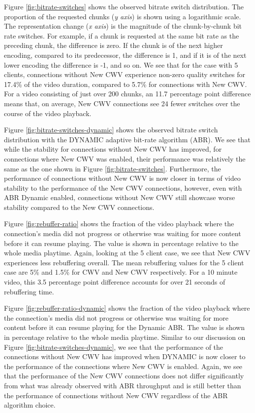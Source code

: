 \documentclass[10pt,sigconf]{acmart}
\begin{document}
Figure \ref{fig:bitrate-switches} shows the observed bitrate switch distribution. The proportion of the requested chunks (\emph{y axis}) is shown using a logarithmic scale. The representation change (\emph{x axis}) is the magnitude of the chunk-by-chunk bit rate switches. For example, if a chunk is requested at the same bit rate as the preceding chunk, the difference is zero. If the chunk is of the next higher encoding, compared to its predecessor, the difference is 1, and if it is of the next lower encoding the difference is -1, and so on. We see that for the case with 5 clients, connections without New CWV experience non-zero quality switches for 17.4\% of the video duration, compared to 5.7\% for connections with New CWV. For a video consisting of just over 200 chunks, an 11.7 percentage point difference means that, on average, New CWV connections see 24 fewer switches over the course of the video playback.

Figure \ref{fig:bitrate-switches-dynamic} shows the observed bitrate switch distribution with the DYNAMIC adaptive bit-rate algorithm (ABR). We see that while the stability for connections without New CWV has improved, for connections where New CWV was enabled, their performance was relatively the same as the one shown in Figure \ref{fig:bitrate-switches}. Furthermore, the performance of connections without New CWV is now closer in terms of video stability to the performance of the New CWV connections, however, even with ABR Dynamic enabled, connections without New CWV still showcase worse stability compared to the New CWV connections.

Figure \ref{fig:rebuffer-ratio} shows the fraction of the video playback where the connection's media did not progress or otherwise was waiting for more content before it can resume playing. The value is shown in percentage relative to the whole media playtime. Again, looking at the 5 client case, we see that New CWV experiences less rebuffering overall. The mean rebuffering values for the 5 client case are 5\% and 1.5\% for CWV and New CWV respectively. For a 10 minute video, this 3.5 percentage point difference accounts for over 21 seconds of rebuffering time.

Figure \ref{fig:rebuffer-ratio-dynamic} shows the fraction of the video playback where the connection's media did not progress or otherwise was waiting for more content before it can resume playing for the Dynamic ABR. The value is shown in percentage relative to the whole media playtime. Similar to our discussion on Figure \ref{fig:bitrate-switches-dynamic}, we see that the performance of the connections without New CWV has improved when DYNAMIC is now closer to the performance of the connections where New CWV is enabled. Again, we see that the performance of the New CWV connections does not differ significantly from what was already observed with ABR throughput and is still better than the performance of connections without New CWV regardless of the ABR algorithm choice.
\end{document}
